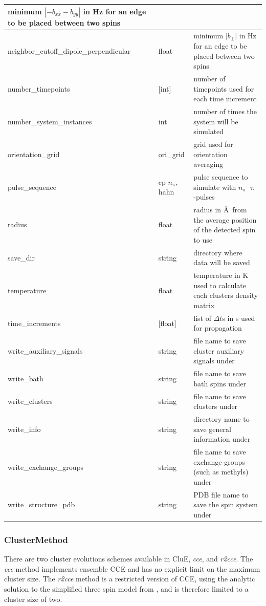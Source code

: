 \documentclass{book}
\begin{document}
\begin{center}
\begin{tabular}{| m{20em} | m{1.5cm}| m{7cm} |}
 minimum $|-b_{xx}-b_{yy}|$ in Hz 
 for an edge to be placed between two spins\\
 \hline 
 neighbor\_cutoff\_dipole\_perpendicular & float & 
 minimum $|b_{\perp}|$ in Hz 
 for an edge to be placed between two spins\\
 \hline 
 number\_timepoints  & [int] & 
 number of timepoints used for each time increment\\ 
 \hline 
 number\_system\_instances  & int & 
 number of times the system will be simulated\\ 
 \hline 
 orientation\_grid  & ori\_grid & grid used for orientation averaging\\ 
 \hline 
 pulse\_sequence & cp-$n_{\uppi}$, hahn & 
 pulse sequence to simulate with $n_{\uppi}$ $\uppi$-pulses\\
 \hline 
 radius & float & 
 radius in \AA~from the average position of the detected spin to use\\
 \hline 
 save\_dir & string & 
 directory where data will be saved\\
 \hline 
 temperature & float & 
 temperature in K used to calculate each clusters density matrix\\
 \hline 
 time\_increments  & [float] & 
 list of $\Delta t$s in s used for propagation\\ 
 \hline 
 write\_auxiliary\_signals & string & 
 file name to save cluster auxiliary signals under\\
 \hline 
 write\_bath & string & 
 file name to save bath spins under\\
 \hline 
 write\_clusters & string & 
 file name to save clusters under\\
 \hline 
 write\_info & string & 
 directory name to save general information under\\
 \hline 
 write\_exchange\_groups & string & 
 file name to save exchange groups (such as methyls) under\\
 \hline 
 write\_structure\_pdb & string & 
 PDB file name to save the spin system under\\
 \hline 
\end{tabular}
\end{center} 
\subsubsection{ClusterMethod} %
There are two cluster evolutions schemes available in CluE, 
\textit{cce}, and \textit{r2cce}.
The \textit{cce} method implements ensemble CCE
\cite{2008_Yang_Liu,2009_Yang_Liu} and has no explicit limit on the maximum
cluster size.  
The \textit{r2cce} method is a restricted version of CCE, 
using the analytic solution to the simplified three spin model from
\cite{2006_Witzel_DasSarma}, and is therefore limited to a cluster size of two.
\end{document}
